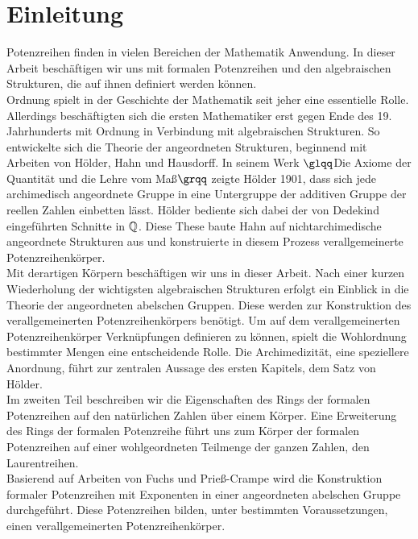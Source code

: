 \chapter{Einleitung}
%
Potenzreihen finden in vielen Bereichen der Mathematik Anwendung. In dieser Arbeit beschäftigen wir uns mit formalen Potenzreihen und den algebraischen Strukturen, die auf ihnen definiert werden können. \\
Ordnung spielt  in der Geschichte der Mathematik seit jeher eine essentielle Rolle. Allerdings beschäftigten sich die ersten Mathematiker erst gegen Ende des 19. Jahrhunderts mit Ordnung in Verbindung mit algebraischen Strukturen. So entwickelte sich die Theorie der angeordneten Strukturen, beginnend mit Arbeiten von Hölder, Hahn und Hausdorff. In seinem Werk $\glqq$Die Axiome der Quantität und die Lehre vom Maß$\grqq$ zeigte Hölder 1901, dass sich jede archimedisch angeordnete Gruppe in eine Untergruppe der additiven Gruppe der reellen Zahlen einbetten lässt. Hölder bediente sich dabei der von Dedekind eingeführten Schnitte in $\mathbb{Q}$. Diese These baute Hahn auf nichtarchimedische angeordnete Strukturen aus und konstruierte in diesem Prozess verallgemeinerte Potenzreihenkörper.    \\
Mit derartigen Körpern beschäftigen wir uns in dieser Arbeit. Nach einer kurzen Wiederholung der wichtigsten algebraischen Strukturen erfolgt ein Einblick in die Theorie der angeordneten abelschen Gruppen. Diese werden zur Konstruktion des verallgemeinerten Potenzreihenkörpers benötigt. Um auf dem verallgemeinerten Potenzreihenkörper Verknüpfungen definieren zu können, spielt die Wohlordnung bestimmter Mengen eine entscheidende Rolle. Die Archimedizität, eine speziellere Anordnung, führt zur zentralen Aussage des ersten Kapitels, dem Satz von Hölder. \\
Im zweiten Teil beschreiben wir die Eigenschaften des Rings der formalen Potenzreihen auf den natürlichen Zahlen über einem Körper. Eine Erweiterung des Rings der formalen Potenzreihe führt uns zum Körper der formalen Potenzreihen auf einer wohlgeordneten Teilmenge der ganzen Zahlen, den Laurentreihen.\\
Basierend auf Arbeiten von Fuchs und Prieß-Crampe wird die Konstruktion formaler Potenzreihen mit Exponenten in einer angeordneten abelschen Gruppe durchgeführt. Diese Potenzreihen bilden, unter bestimmten Voraussetzungen, einen verallgemeinerten Potenzreihenkörper.




%
%
%
